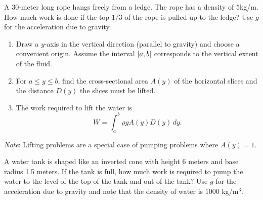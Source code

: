 \documentclass[../mathNotesPreamble]{subfiles}
\begin{document}
  \begin{ex*}
    A $30$-meter long rope hangs freely from a ledge. The rope has a density of $5$\nobreakspace kg/m.  How much work is done if the top $1/3$ of the rope is pulled up to the ledge? Use $g$ for the acceleration due to gravity.
  \end{ex*}
  \pagebreak

  \begin{thmBox*}
    \begin{enumerate}
      \item 
        Draw a $y$-axis in the vertical direction (parallel to gravity) and choose a convenient origin. Assume the interval ${\left[a,b\right]}$ corresponds to the vertical extent of the fluid.
      \item 
        For $a\leq y\leq b$, find the cross-sectional area $A(y)$ of the horizontal slices and the distance $D(y)$ the slices must be lifted.
      \item 
        The work required to lift the water is
          \[W=\int_a^b \rho gA(y)D(y)\,dy.\]
    \end{enumerate}
    \textit{Note}: Lifting problems are a special case of pumping problems where $A(y)=1$.
  \end{thmBox*}

  \begin{ex*}
    A water tank is shaped like an inverted cone with height 6 meters and base radius 1.5 meters. If the tank is full, how much work is required to pump the water to the level of the top of the tank and out of the tank? Use $g$ for the acceleration due to gravity and note that the density of water is $1000$ kg/m$^3$. 
  \end{ex*}
  \begin{flushright}
    \def\xx{2.75}
    \def\xxx{\xx+2.15}
  \end{flushright}
  \pagebreak
\end{document}
